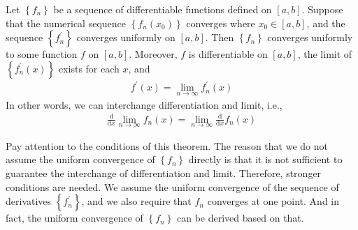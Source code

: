 \documentclass[thmcnt=section, 12pt]{elegantbook}
\begin{document}
\begin{theorem}
    Let $\left\{f_n\right\}$ be a sequence of differentiable functions defined on $[a,b]$. Suppose that the numerical sequence $\left\{f_n(x_0)\right\}$ converges where $x_0 \in [a,b]$, and the sequence $\left\{f_n^\prime\right\}$ converges uniformly on $[a,b]$. Then $\left\{f_n\right\}$ converges uniformly to some function $f$ on $[a, b]$. Moreover, $f$ is differentiable on $[a, b]$, the limit of $\left\{f_n^\prime(x)\right\}$ exists for each $x$, and
    \begin{align}
        f^\prime(x) = \lim_{n \to \infty} f_n^\prime(x)
        \label{eq:16}
    \end{align}
    In other words, we can interchange differentiation and limit, i.e., 
    \begin{align*}
        \frac{\mathrm{d}}{\mathrm{d} x} \lim_{n \to \infty} f_n(x)
        = \lim_{n \to \infty} \frac{\mathrm{d}}{\mathrm{d} x} f_n(x)
    \end{align*}
\end{theorem}

\begin{remark}
    Pay attention to the conditions of this theorem. The reason that we do not assume the uniform convergence of $\left\{f_n\right\}$ directly is that it is not sufficient to guarantee the interchange of differentiation and limit. Therefore, stronger conditions are needed. We assume the uniform convergence of the sequence of derivatives $\left\{f_n^\prime\right\}$, and we also require that $f_n$ converges at one point. And in fact, the uniform convergence of $\left\{f_n\right\}$ can be derived based on that.
\end{remark}
\end{document}
